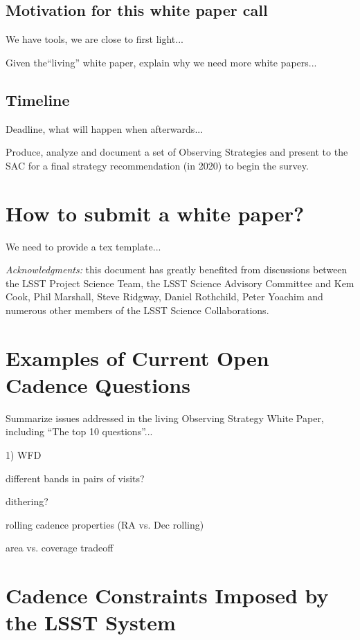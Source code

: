 \documentclass[DM,lsstdraft,toc,usenatbib]{lsstdoc}
\begin{document}
\subsection{Motivation for this white paper call}

We have tools, we are close to first light... 

Given the``living'' white paper, explain why we need more white papers...


\subsection{Timeline}

Deadline, what will happen when afterwards...

Produce, analyze and document a set of Observing Strategies and present to 
the SAC for a final strategy recommendation (in 2020) to begin the survey.



\section{How to submit a white paper?} 

We need to provide a tex template... 


\vskip 0.0in
\newpage
{\it Acknowledgments:} this document has greatly benefited from discussions between 
the LSST Project Science Team, the LSST Science Advisory Committee and Kem Cook, 
Phil Marshall, Steve Ridgway, Daniel Rothchild, Peter Yoachim and numerous other members 
of the LSST Science Collaborations. 

\appendix


\section{Examples of Current Open Cadence Questions} 

Summarize issues addressed in the living Observing Strategy White Paper, 
including ``The top 10 questions''... 


1) WFD 

different bands in pairs of visits?

dithering? 

rolling cadence properties (RA vs. Dec rolling) 

area vs. coverage tradeoff 





\section{Cadence Constraints Imposed by the LSST System} 
\end{document}

